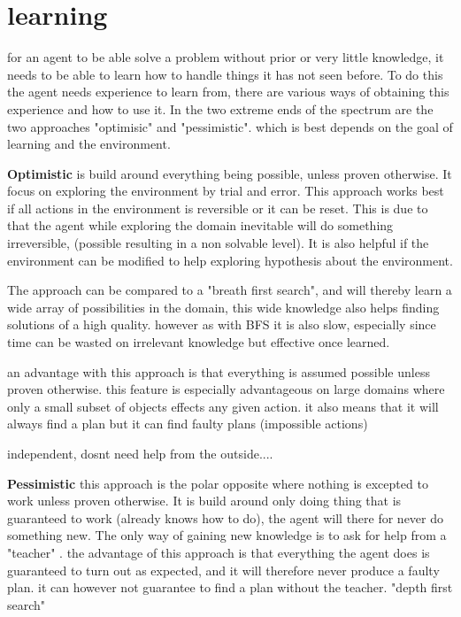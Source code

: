 \section{learning}
	for an agent to be able solve a problem without prior or very little knowledge, it needs to be able to learn how to handle things it has not seen before. To do this the agent needs experience to learn from, there are various ways of obtaining this experience and how to use it. In the two extreme ends of the spectrum are the two approaches "optimisic" and "pessimistic". which is best depends on the goal of learning and the environment.

	
	\textbf{Optimistic} is build around everything being possible, unless proven otherwise. It focus on exploring the environment by trial and error. This approach works best if all actions in the environment is reversible or it can be reset. This is due to that the agent while exploring the domain inevitable will do something irreversible, (possible resulting in a non solvable level). It is also helpful if the environment can be modified to help exploring hypothesis about the environment.
		
	The approach can be compared to a "breath first search", and will thereby learn a wide array of possibilities in the domain, this wide knowledge also helps finding solutions of a high quality. however as with BFS it is also slow, especially since time can be wasted on irrelevant knowledge but effective once learned.


		an advantage with this approach is that everything is assumed possible unless proven otherwise. this feature is especially advantageous on large domains where only a small subset of objects effects any given action. it also means that it will always find a plan but it can find faulty plans (impossible actions)
				
				independent, dosnt need help from the outside....
		
		
		
		
	\textbf{Pessimistic} this approach is the polar opposite where nothing is excepted to work unless proven otherwise. It is build around only doing thing that is guaranteed to work (already knows how to do), the agent will there for never do something new. The only way of gaining new knowledge is to ask for help from a "teacher" \cite{Action-Schemas}.
	the advantage of this approach is that everything the agent does is guaranteed to turn out as expected, and it will therefore never produce a faulty plan. it can however not guarantee to find a plan without the teacher.
	"depth first search"
	
